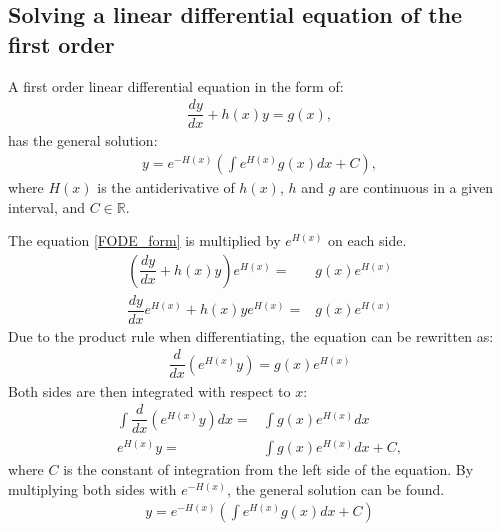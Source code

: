 \subsection{Solving a linear differential equation of the first order}
\begin{tcolorbox}[colback=green!5!white,colframe=green!40!black,title=Theorem 2.1: General solution to a linear differential equation of the first order]
A first order linear differential equation in the form of:
\begin{align} \label{FODE_form}
\dfrac{dy}{dx}+h(x)y=g(x),
\end{align}
has the general solution:
\begin{align} \label{FODE_solution}
y=e^{-H(x)}\left(\int e^{H(x)}g(x)dx+C\right),
\end{align}
where $H(x)$ is the antiderivative of $h(x)$, $h$ and $g$ are continuous in a given interval, and $C\in \mathbb{R}$.
\end{tcolorbox}
\begin{tcolorbox}[colback=gray!5!white,colframe=gray!!black,title=Proof 2.1]
The equation \eqref{FODE_form} is multiplied by $e^{H(x)}$ on each side.
\begin{align*}
\left(\dfrac{dy}{dx}+h(x)y\right)e^{H(x)}=&g(x)e^{H(x)}
\\
\dfrac{dy}{dx}e^{H(x)}+h(x)ye^{H(x)}=&g(x)e^{H(x)}
\end{align*}
Due to the product rule when differentiating, the equation can be rewritten as:
\begin{align*}
\dfrac{d}{dx}\left(e^{H(x)}y\right)=g(x)e^{H(x)}
\end{align*}
Both sides are then integrated with respect to $x$:
\begin{align*}
\int\dfrac{d}{dx}\left(e^{H(x)}y\right)dx=&\int g(x)e^{H(x)}dx
\\
e^{H(x)}y=&\int g(x)e^{H(x)}dx+C,
\end{align*}
where $C$ is the constant of integration from the left side of the  equation. By multiplying both sides with $e^{-H(x)}$, the general solution can be found.
\begin{align}
y=e^{-H(x)}\left(\int e^{H(x)}g(x)dx+C\right)
\end{align}
\end{tcolorbox}

